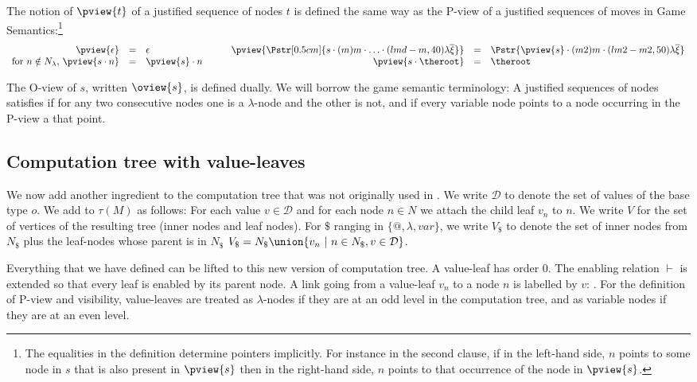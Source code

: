 The notion of  $\pview{t}$ of a justified sequence of
nodes $t$ is defined the same way as the P-view of a justified
sequences of moves in Game Semantics:\footnote{ The equalities in the
  definition determine pointers implicitly. For instance in the second
  clause, if in the left-hand side, $n$ points to some node in $s$
  that is also present in $\pview{s}$ then in the right-hand side, $n$
  points to that occurrence of the node in $\pview{s}$.}
$$\begin{array}{rclrcl}
\pview{\epsilon} &=&  \epsilon
& \pview{\Pstr[0.5cm]{ s \cdot (m) m \cdot \ldots \cdot (lmd-m,40){\lambda\overline{\xi}}
}}
 &=& \Pstr{
\pview{s} \cdot (m2) m \cdot (lm2-m2,50) {\lambda \overline{\xi}} } \\
\mbox{for $n \notin N_\lambda$, } \pview{s \cdot n }  &=&  \pview{s} \cdot n \qquad
& \pview{s \cdot \theroot }  &=&  \theroot
\end{array}$$

The O-view of $s$, written $\oview{s}$, is defined dually. We will
borrow the game semantic terminology: A justified sequences of nodes
satisfies  if for any two consecutive nodes one
is a $\lambda$-node and the other is not, and 
if every variable node points to a node occurring in the P-view a
that point.

\subsection{Computation tree with value-leaves}


We now add another ingredient to the computation tree that was not
originally used in \cite{OngLics2006}.  We write $\mathcal{D}$ to
denote the set of values of the base type $o$.  We add
 to $\tau(M)$ as follows: For each value $v
\in \mathcal{D}$ and for each node $n \in N$ we attach the child
leaf $v_n$ to $n$.  We write $V$ for the set of vertices of the
resulting tree (\ie inner nodes and leaf nodes). For $\$$ ranging in
$\{@, \lambda, var \}$, we write $V_\$$ to denote the set of inner
nodes from $N_\$$ plus the leaf-nodes whose parent is in $N_\$$ \ie
$V_\$ = N_\$ \union \{ v_n \ | \ n \in N_\$, v \in \mathcal{D} \}$.


Everything that we have defined can be lifted to this new version of
computation tree. A value-leaf has order $0$. The enabling relation
$\vdash$ is extended so that every leaf is enabled by its parent
node. A link going from a value-leaf $v_n$ to a node $n$ is labelled
by $v$: . For the
definition of P-view and visibility, value-leaves are treated as
$\lambda$-nodes if they are at an odd level in the computation tree,
and as variable nodes if they are at an even level.


